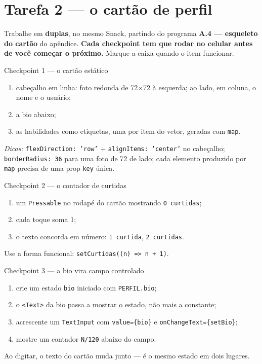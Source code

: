 \documentclass[11pt,a4paper]{article}
\newcommand{\cod}[1]{\texttt{#1}}
\newcommand{\caixa}{\(\square\)}
\begin{document}
\section{Tarefa 2 --- o cartão de perfil}
Trabalhe em \textbf{duplas}, no mesmo Snack, partindo do programa
\textbf{A.4 --- esqueleto do cartão} do apêndice.
\textbf{Cada checkpoint tem que rodar no celular antes de você começar o próximo.}
Marque a caixa quando o item funcionar.

\begin{tarefa}{Checkpoint 1 --- o cartão estático}
\begin{enumerate}[label=\caixa]
  \item cabeçalho em linha: foto redonda de 72×72 à esquerda; ao lado, em coluna, o nome e o usuário;
  \item a bio abaixo;
  \item as habilidades como etiquetas, uma por item do vetor, geradas com \cod{map}.
\end{enumerate}
\textit{Dicas:} \cod{flexDirection: 'row'} + \cod{alignItems: 'center'} no cabeçalho;
\cod{borderRadius: 36} para uma foto de 72 de lado; cada elemento produzido por \cod{map}
precisa de uma prop \cod{key} única.
\end{tarefa}

\begin{tarefa}{Checkpoint 2 --- o contador de curtidas}
\begin{enumerate}[label=\caixa]
  \item um \cod{Pressable} no rodapé do cartão mostrando \cod{0 curtidas};
  \item cada toque soma 1;
  \item o texto concorda em número: \cod{1 curtida}, \cod{2 curtidas}.
\end{enumerate}
Use a forma funcional: \cod{setCurtidas((n) => n + 1)}.
\end{tarefa}

\begin{tarefa}{Checkpoint 3 --- a bio vira campo controlado}
\begin{enumerate}[label=\caixa]
  \item crie um estado \cod{bio} iniciado com \cod{PERFIL.bio};
  \item o \cod{<Text>} da bio passa a mostrar o estado, não mais a constante;
  \item acrescente um \cod{TextInput} com \cod{value=\{bio\}} e \cod{onChangeText=\{setBio\}};
  \item mostre um contador \cod{N/120} abaixo do campo.
\end{enumerate}
Ao digitar, o texto do cartão muda junto --- é o mesmo estado em dois lugares.
\end{tarefa}
\end{document}
